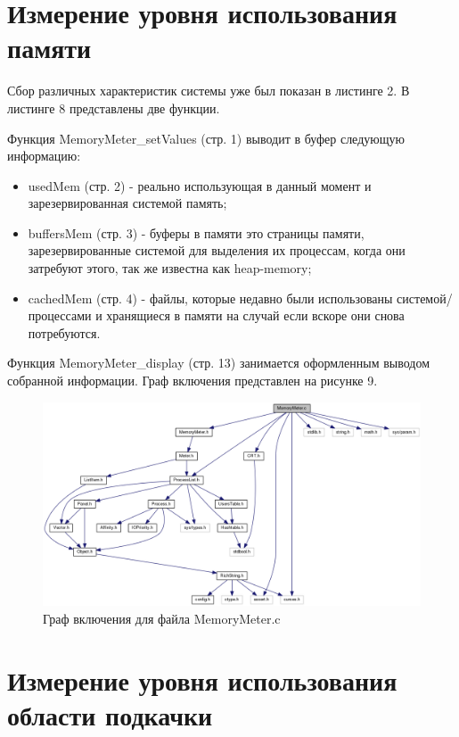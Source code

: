 \documentclass[a4paper, 12pt]{article}		%
\begin{document}
\section{Измерение уровня использования памяти}

Сбор различных характеристик системы уже был показан в листинге 2. В листинге 8 представлены две функции.

Функция MemoryMeter\_setValues (стр. 1) выводит в буфер следующую информацию:
\begin{itemize}
\item usedMem (стр. 2) - реально использующая в данный момент и зарезервированная системой память;
\item buffersMem (стр. 3) - буферы в памяти это страницы памяти, зарезервированные системой для выделения их процессам, когда они затребуют этого, так же известна как heap-memory;
\item cachedMem (стр. 4) - файлы, которые недавно были использованы системой/процессами и хранящиеся в памяти на случай если вскоре они снова потребуются.
\end{itemize}

Функция MemoryMeter\_display (стр. 13) занимается оформленным выводом собранной информации. Граф включения представлен на рисунке 9.



\begin{figure}[h!]
\centering
\includegraphics[scale=0.43]{res/memory_meter.png}
\caption{Граф включения для файла MemoryMeter.c}
\end{figure}

\newpage
\section{Измерение уровня использования области подкачки}
\end{document}
